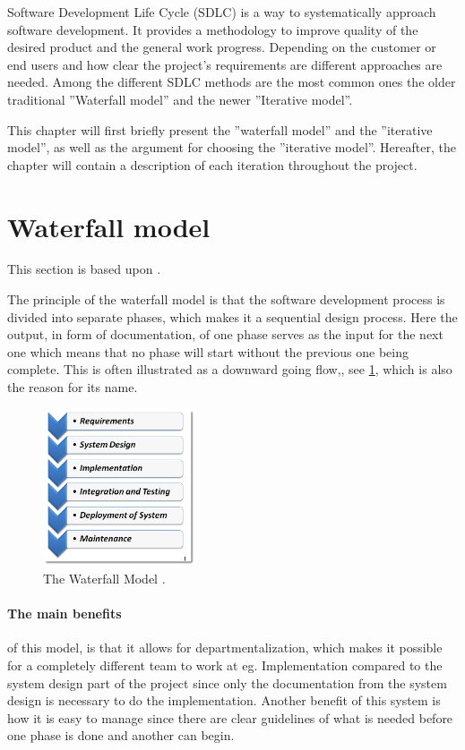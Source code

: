 Software Development Life Cycle (SDLC) is a way to systematically approach software development.
It provides a methodology to improve quality of the desired product and the general work progress. 
Depending on the customer or end users and how clear the project's requirements are different approaches are needed. 
Among the different SDLC methods are the most common ones the older traditional ''Waterfall model'' and the newer ''Iterative model''.\cite{SDLC-Toolsqa}


This chapter will first briefly present the ''waterfall model'' and the ''iterative model'', as well as the argument for choosing the ''iterative model''.
Hereafter, the chapter will contain a description of each iteration throughout the project.


\section{Waterfall model}
This section is based upon \cite{Waterfall-Toolsqa}.

The principle of the waterfall model is that the software development process is divided into separate phases, which makes it a sequential design process.
Here the output, in form of documentation, of one phase serves as the input for the next one which means that no phase will start without the previous one being complete.
This is often illustrated as a downward going flow,, see \cref{fig:Waterfall}, which is also the reason for its name.

\begin{figure}[H]
	\centering
	\includegraphics[width=0.4\textwidth]{billeder/WaterFall-Model.png}
	\caption{The Waterfall Model \cite{Waterfall-Toolsqa}.}\label{fig:Waterfall}
\end{figure}

\paragraph{The main benefits} of this model, is that it allows for departmentalization, which makes it possible for a completely different team to work at eg. Implementation compared to the system design part of the project since only the documentation from the system design is necessary to do the implementation.
Another benefit of this system is how it is easy to manage since there are clear guidelines of what is needed before one phase is done and another can begin.

